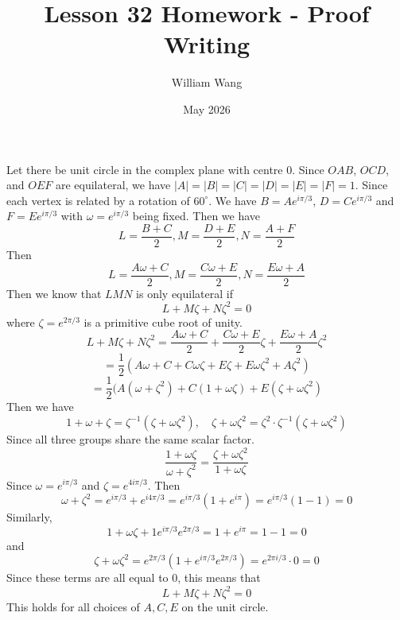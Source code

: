 \documentclass{article}
\title{Lesson 32 Homework - Proof Writing}
\author{William Wang}
\date{May 2026}
\begin{document}
\maketitle

\section{}
Let there be unit circle in the complex plane with centre $0$. Since \(OAB\), \(OCD\), and \(OEF\) are equilateral, we have \(|A| = |B| = |C| = |D| = |E| = |F|=1\). Since each vertex is related by a rotation of \(60^\circ\). We have \(B = Ae^{i\pi/3}\), \(D = Ce^{i\pi/3}\) and \(F = Ee^{i\pi/3}\) with \(\omega = e^{i\pi/3}\) being fixed. Then we have 
\[L = \frac{B+C}{2}, M = \frac{D+E}{2}, N = \frac{A+F}{2}\]
Then
\[L = \frac{A\omega +C}{2}, M = \frac{C\omega +E}{2}, N = \frac{E\omega + A}{2}\]
Then we know that \(LMN\) is only equilateral if 
\[L + M\zeta + N\zeta^2 = 0\]
where \(\zeta = e^{2\pi/3}\) is a primitive cube root of unity. 
\[L + M\zeta + N\zeta^2 = \frac{A\omega +C}{2} + \frac{C\omega +E}{2}\zeta + \frac{E\omega + A}{2}\zeta^2\]
\[= \frac{1}{2}(A\omega + C + C\omega\zeta + E\zeta + E\omega\zeta^2 + A\zeta^2)\]
\[= \frac{1}{2}(A(\omega+\zeta^2) + C(1+\omega\zeta) + E(\zeta + \omega\zeta^2)\]
Then we have 
\[1+\omega+\zeta = \zeta^{-1}(\zeta + \omega\zeta^2), \quad \zeta+\omega\zeta^2 = \zeta^2\cdot \zeta^{-1}(\zeta+\omega\zeta^2)\]
Since all three groups share the same scalar factor. 
\[\frac{1+\omega\zeta}{\omega+\zeta^2} = \frac{\zeta+\omega\zeta^2}{1+\omega\zeta}\]
Since \(\omega = e^{i\pi/3}\) and \(\zeta = e^{4i\pi/3}\). Then 
\[\omega + \zeta^2 = e^{i\pi/3} + e^{i4\pi/3} = e^{i\pi/3}(1+e^{i\pi}) = e^{i\pi/3}(1-1) =0\]
Similarly,
\[1+\omega\zeta + 1e^{i\pi/3}e^{2\pi/3} = 1+e^{i\pi} = 1-1 = 0\]
and
\[\zeta+\omega\zeta^2 = e^{2\pi/3}(1+ e^{i\pi/3}e^{2\pi/3}) = e^{2\pi i /3} \cdot 0 = 0\]
Since these terms are all equal to $0$, this means that 
\[L + M\zeta+N\zeta^2 = 0\]
This holds for all choices of $A, C, E$ on the unit circle. 

\section{}
\end{document}
